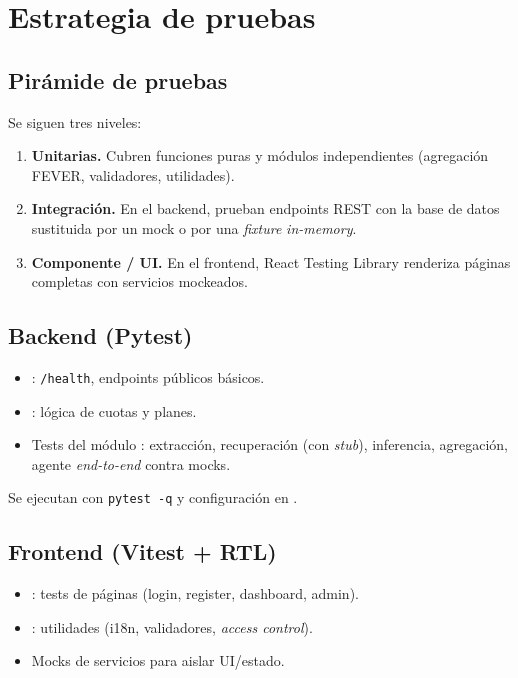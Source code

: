 \chapter{Estrategia de pruebas}\label{cap:pruebas}

\section{Pirámide de pruebas}

Se siguen tres niveles:

\begin{enumerate}[leftmargin=*,itemsep=0.2em]
  \item \textbf{Unitarias.} Cubren funciones puras y módulos
        independientes (agregación FEVER, validadores, utilidades).
  \item \textbf{Integración.} En el backend, prueban endpoints REST
        con la base de datos sustituida por un mock o por una
        \emph{fixture} \emph{in-memory}.
  \item \textbf{Componente / UI.} En el frontend, React Testing
        Library renderiza páginas completas con servicios mockeados.
\end{enumerate}

\section{Backend (Pytest)}

\begin{itemize}[leftmargin=*,itemsep=0.2em]
  \item {}: \texttt{/health},
        endpoints públicos básicos.
  \item {}: lógica de cuotas y planes.
  \item Tests del módulo : extracción, recuperación
        (con \emph{stub}), inferencia, agregación, agente \emph{end-to-end}
        contra mocks.
\end{itemize}

Se ejecutan con \texttt{pytest -q} y configuración en
.

\section{Frontend (Vitest + RTL)}

\begin{itemize}[leftmargin=*,itemsep=0.2em]
  \item {}: tests de páginas
        (login, register, dashboard, admin).
  \item {}: utilidades (i18n, validadores,
        \emph{access control}).
  \item Mocks de servicios para aislar UI/estado.
\end{itemize}

